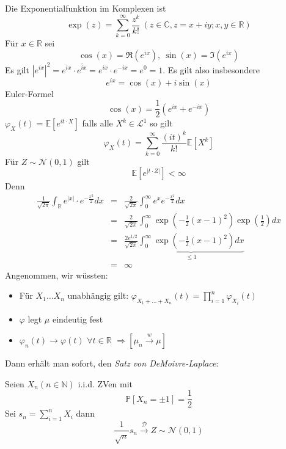 \documentclass[10pt,a4paper]{report}
\numberwithin{equation}{section}
\numberwithin{figure}{section}
\theoremstyle{plain}
\theoremstyle{definition}
\theoremstyle{remark}
\theoremstyle{plain}
\newcommand{\1}{ \mathbb{1} } %
\begin{document}
Die Exponentialfunktion im Komplexen ist 
\[
\exp\left(z\right)=\sum_{k=0}^{\infty}\frac{z^{k}}{k!}\ \left(z\in\mathbb{C},z=x+iy;x,y\in\mathbb{R}\right)
\]
Für $x\in\mathbb{R}$ sei
\[
\cos\left(x\right)=\Re\left(e^{ix}\right),\ \sin\left(x\right)=\Im\left(e^{ix}\right)
\]
Es gilt $\left|e^{ix}\right|^{2}=e^{ix}\cdot\overline{e^{ix}}=e^{ix}\cdot e^{-ix}=e^{0}=1$.
Es gilt also insbesondere 
\[
e^{ix}=\cos\left(x\right)+i\sin\left(x\right)
\]
Euler-Formel 
\[
\cos\left(x\right)=\frac{1}{2}\left(e^{ix}+e^{-ix}\right)
\]
$\varphi_{X}\left(t\right)=\mathbb{E}\left[e^{it\cdot X}\right]$
falls alle $X^{k}\in\mathcal{L}^{1}$ so gilt 
\[
\varphi_{X}\left(t\right)=\sum_{k=0}^{\infty}\frac{\left(it\right)^{k}}{k!}\mathbb{E}\left[X^{k}\right]
\]
Für $Z\sim\mathcal{N}\left(0,1\right)$ gilt
\[
\mathbb{E}\left[e^{\left|t\cdot Z\right|}\right]<\infty
\]
Denn 
\begin{eqnarray*}
\frac{1}{\sqrt{2\pi}}\int_{\mathbb{R}}e^{\left|x\right|}\cdot e^{-\frac{x^{2}}{2}}dx & = & \frac{2}{\sqrt{2\pi}}\int_{0}^{\infty}e^{x}e^{-\frac{x^{2}}{2}}dx\\
 & = & \frac{2}{\sqrt{2\pi}}\int_{0}^{\infty}\exp\left(-\frac{1}{2}\left(x-1\right)^{2}\right)\exp\left(\frac{1}{2}\right)dx\\
 & = & \frac{2e^{1/2}}{\sqrt{2\pi}}\underset{\leq1}{\underbrace{\int_{0}^{\infty}\exp\left(-\frac{1}{2}\left(x-1\right)^{2}\right)dx}}\\
 & = & \infty
\end{eqnarray*}
Angenommen, wir wüssten:
\begin{itemize}
\item Für $X_{1}\ldots X_{n}$ unabhängig gilt: $\varphi_{X_{1}+\ldots+X_{n}}\left(t\right)=\prod_{i=1}^{n}\varphi_{X_{i}}\left(t\right)$
\item $\varphi$ legt $\mu$ eindeutig fest
\item $\varphi_{n}\left(t\right)\to\varphi\left(t\right)$ $\forall t\in\mathbb{R}$
$\Rightarrow\left[\mu_{n}\overset{w}{\longrightarrow}\mu\right]$
\end{itemize}
Dann erhält man sofort, den \emph{Satz von DeMoivre-Laplace}:

Seien $X_{n}\left(n\in\mathbb{N}\right)$ i.i.d. ZVen mit 
\[
\mathbb{P}\left[X_{n}=\pm1\right]=\frac{1}{2}
\]
Sei $s_{n}=\sum_{i=1}^{n}X_{i}$ dann 
\[
\frac{1}{\sqrt{n}}s_{n}\overset{\mathcal{D}}{\longrightarrow}Z\sim\mathcal{N}\left(0,1\right)
\]

\end{document}
